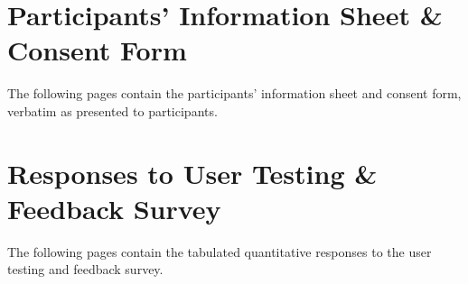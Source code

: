 \documentclass[../main.tex]{subfiles}
\begin{document}
\appendix
    \chapter{Participants' Information Sheet \& Consent Form} \label{app:consent}
        The following pages contain the participants' information sheet and consent
            form, verbatim as presented to participants.

        \begin{center}
            
        \end{center}

    \chapter{Responses to User Testing \& Feedback Survey} \label{app:feedback}
        The following pages contain the tabulated quantitative responses to the user
            testing and feedback survey.
\end{document}
